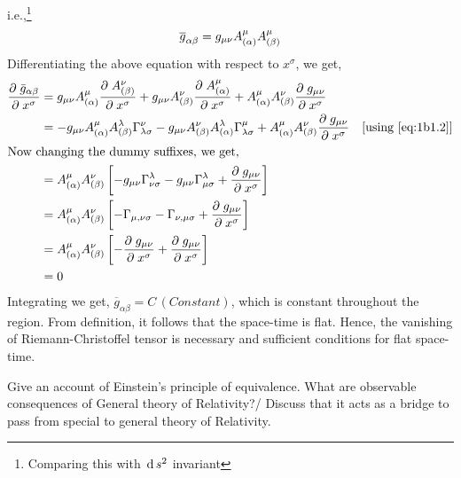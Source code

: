 \documentclass[../main-sheet.tex]{subfiles}
\begin{document}
\begin{soln}
            i.e.,\footnote{Comparing this with \(\,\mathrm{d}\, s^2\) invariant}
            \begin{equation}
                \overline{g}_{\alpha\beta}=g_{{\mu\nu}} A_{(\alpha)}^\mu A_{(\beta)}^\mu\label{eq:1b.3}
            \end{equation}
            Differentiating the above equation with respect to \(x^\sigma\), we get,
            \begin{align*}
                \frac{\partial\;\bar{g}_{\alpha\beta}}{\partial\; x^\sigma} &= g_{{\mu\nu}} A_{(\alpha)}^\mu\frac{\partial\;A_{(\beta)}^\nu}{\partial\; x^\sigma}+g_{{\mu\nu}}A_{(\beta)}^\nu\frac{\partial\;A_{(\alpha)}^\mu}{\partial\; x^\sigma}+A_{(\alpha)}^\mu A_{(\beta)}^\nu \frac{\partial\;g_{{\mu\nu}}}{\partial\; x^\sigma}\\
                &=-g_{{\mu\nu}} A_{(\alpha)}^\mu A_{(\beta)}^\lambda \Gamma_{\lambda\sigma}^\nu - g_{{\mu\nu}} A_{(\beta)}^\nu A_{(\alpha)}^\lambda \Gamma_{\lambda\sigma}^\mu+A_{(\alpha)}^\mu A_{(\beta)}^\nu \frac{\partial\;g_{\mu\nu}}{\partial\; x^\sigma}\quad[\text{using \eqref{eq:1b1.2}}]
                \\
                \intertext{Now changing the dummy suffixes, we get,}
                &=A_{(\alpha)}^\mu A_{(\beta)}^\nu \left[-g_{{\mu\nu}} \Gamma_{\nu\sigma}^\lambda-g_{{\mu\nu}} \Gamma_{\mu\sigma}^\lambda+\frac{\partial\;g_{\mu\nu}}{\partial\; x^\sigma}\right]\\
                &=A_{(\alpha)}^\mu A_{(\beta)}^\nu \left[-\Gamma_{\mu,\nu\sigma}-\Gamma_{\nu,\mu\sigma}+\frac{\partial\;g_{\mu\nu}}{\partial\; x^\sigma}\right]\\
                &=A_{(\alpha)}^\mu A_{(\beta)}^\nu \left[-\frac{\partial\;g_{\mu\nu}}{\partial\; x^\sigma}+\frac{\partial\;g_{\mu\nu}}{\partial\; x^\sigma}\right]\\
                &=0
            \end{align*}
            Integrating we get, \(\overline{g}_{\alpha\beta}=C\,(Constant)\), which is constant throughout the region. From definition, it follows that the space-time is flat. Hence, the vanishing of Riemann-Christoffel tensor is necessary and sufficient conditions for flat space-time.
        \end{soln}
        \begin{prob}[6]
            Give an account of Einstein's principle of equivalence. What are observable consequences of General theory of Relativity?/ Discuss that it acts as a bridge to pass from special to general theory of Relativity.
        \end{prob}
\end{document}
